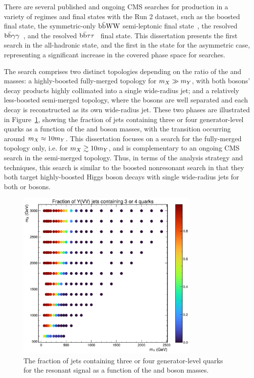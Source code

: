 There are several published and ongoing CMS searches for \XHY production in a variety of regimes and final states with the Run 2 dataset, such as the boosted~\cite{BoostedXHY4b} \bbbb final state, the symmetric-only $\textrm{b}\bar{\textrm{b}}\textrm{W}\textrm{W}$ semi-leptonic final state~\cite{CMS:2024rgy}, the resolved $\textrm{b}\bar{\textrm{b}}\gamma\gamma$~\cite{CMS:2023boe}, and the resolved $\textrm{b}\bar{\textrm{b}}\tau\tau$~\cite{CMS:2021yci} final state. 
This dissertation presents the first search in the \bbvv all-hadronic state, and the first in the \bbvv state for the asymmetric case, representing a significant increase in the covered phase space for \XHY searches.

The search comprises two distinct topologies depending on the ratio of the \PX and \PY masses: a highly-boosted fully-merged \yvv topology for ${m_X} \gg {m_Y}$, with both \VV bosons' decay products highly collimated into a single wide-radius jet; and a relatively less-boosted semi-merged topology, where the \VV bosons are well separated and each \vqq decay is reconstructed as its own wide-radius jet.
These two phases are illustrated in Figure~\ref{fig:05_xhy_fraction_3q4q}, showing the fraction of \yvv jets containing three or four generator-level quarks as a function of the \PX and \PY boson masses, with the transition occurring around ${m_X} \approx 10{m_Y}$.
This dissertation focuses on a search for the fully-merged topology only, i.e. for ${m_X} \gtrsim 10{m_Y}$, and is complementary to an ongoing CMS search in the semi-merged topology.
Thus, in terms of the analysis strategy and techniques, this search is similar to the boosted nonresonant \HH search in that they both target highly-boosted Higgs boson decays with single wide-radius jets for both \PH or \PY bosons.

\begin{figure}[htb] %
    \centering
    \includegraphics[width=0.8\textwidth]{figures/05-HH/production/fraction_3q4q.pdf}
    \caption{The fraction of \yvv jets containing three or four generator-level quarks for the resonant \XHYbbVV signal as a function of the \PX and \PY boson masses.}
    \label{fig:05_xhy_fraction_3q4q}
\end{figure} 


